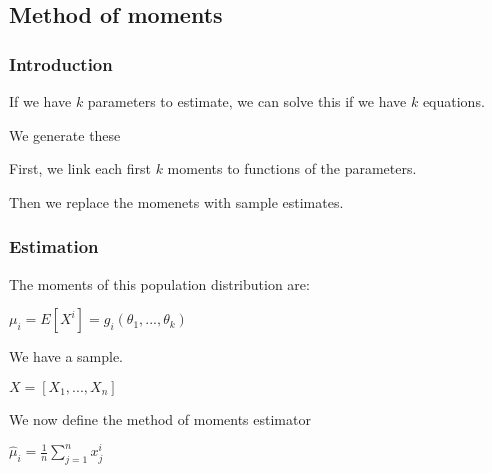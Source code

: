 
\subsection{Method of moments}

\subsubsection{Introduction}

If we have \(k\) parameters to estimate, we can solve this if we have \(k\) equations.

We generate these

First, we link each first \(k\) moments to functions of the parameters.

Then we replace the momenets with sample estimates.

\subsubsection{Estimation}

The moments of this population distribution are:

\(\mu_i =E[X^i]=g_i(\theta_1,...,\theta_k)\)

We have a sample.

\(X=[X_1,...,X_n]\)

We now define the method of moments estimator

\(\hat \mu_i=\frac{1}{n}\sum_{j=1}^nx_j^i\)





